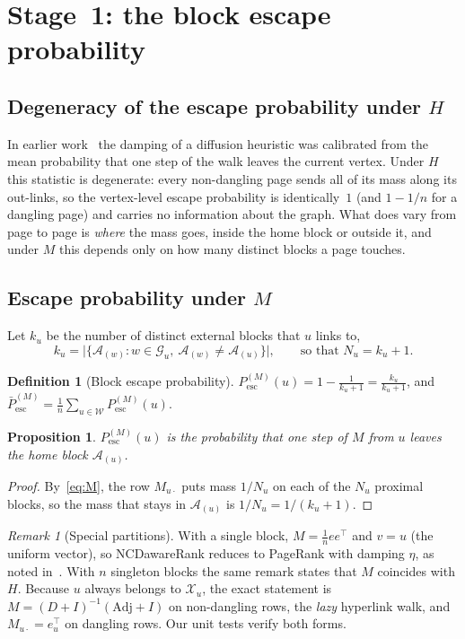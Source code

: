 \documentclass[11pt,a4paper]{article}
\newtheorem{proposition}{Proposition}
\theoremstyle{definition}
\newtheorem{definition}{Definition}
\theoremstyle{remark}
\newtheorem{remark}{Remark}
\newcommand{\Pesc}{P^{(M)}_{\mathrm{esc}}}
\newcommand{\Pbar}{\bar P^{(M)}_{\mathrm{esc}}}
\begin{document}
\section{Stage~1: the block escape probability}
\label{sec:stage1}

\subsection{Degeneracy of the escape probability under \texorpdfstring{$H$}{H}}
In earlier work~\cite{konstantellos26} the damping of a diffusion heuristic was calibrated from the mean
probability that one step of the walk leaves the current vertex. Under $H$ this statistic is degenerate:
every non-dangling page sends all of its mass along its out-links, so the vertex-level escape probability
is identically~$1$ (and $1-1/n$ for a dangling page) and carries no information about the graph. What does
vary from page to page is \emph{where} the mass goes, inside the home block or outside it, and under $M$
this depends only on how many distinct blocks a page touches.

\subsection{Escape probability under \texorpdfstring{$M$}{M}}
Let $k_u$ be the number of distinct external blocks that $u$ links to,
\[
k_u=\bigl|\{\mathcal A_{(w)}:w\in\mathcal G_u,\ \mathcal A_{(w)}\ne\mathcal A_{(u)}\}\bigr|,
\qquad\text{so that } N_u=k_u+1 .
\]

\begin{definition}[Block escape probability]
$\Pesc(u)=1-\frac{1}{k_u+1}=\frac{k_u}{k_u+1}$, and $\Pbar=\frac1n\sum_{u\in\mathcal W}\Pesc(u)$.
\end{definition}

\begin{proposition}\label{prop:esc}
$\Pesc(u)$ is the probability that one step of $M$ from $u$ leaves the home block $\mathcal A_{(u)}$.
\end{proposition}
\begin{proof}
By~\eqref{eq:M}, the row $M_{u\cdot}$ puts mass $1/N_u$ on each of the $N_u$ proximal blocks, so the mass
that stays in $\mathcal A_{(u)}$ is $1/N_u=1/(k_u+1)$.
\end{proof}

\begin{remark}[Special partitions]\label{rem:remark1}
With a single block, $M=\frac1n ee^\top$ and $v=u$ (the uniform vector), so NCDawareRank reduces to
PageRank with damping $\eta$, as noted in~\cite[Remark~1]{ng13}. With $n$ singleton blocks the same
remark states that $M$ coincides with $H$. Because $u$ always belongs to $\mathcal X_u$, the exact
statement is $M=(D+I)^{-1}(\mathrm{Adj}+I)$ on non-dangling rows, the \emph{lazy} hyperlink walk, and
$M_{u\cdot}=e_u^\top$ on dangling rows. Our unit tests verify both forms.
\end{remark}
\end{document}
